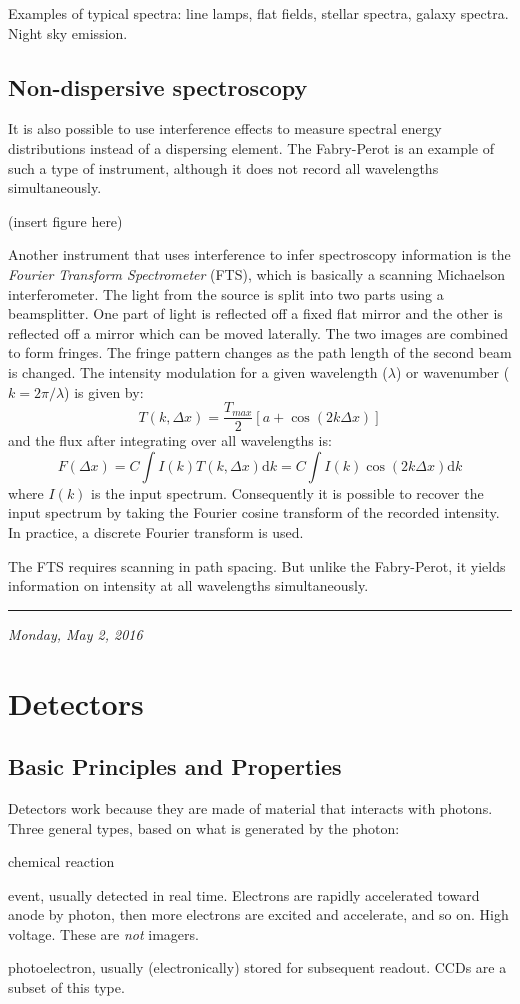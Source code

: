 \documentclass[12pt]{article}
\newcommand{\mydate}[1]{
    \begin{flushright}
        \rule{\textwidth}{0.4pt} %
        \footnotesize\hfill\textit{#1}
    \end{flushright}}
\begin{document}
Examples of typical spectra: line lamps, flat fields, stellar spectra,
galaxy spectra. Night sky emission.

\subsection{Non-dispersive spectroscopy}
It is also possible to use interference effects to measure spectral
energy distributions instead of a dispersing element. The Fabry-Perot
is an example of such a type of instrument, although it does not
record all wavelengths simultaneously.

(insert figure here)

Another instrument that uses interference to infer spectroscopy
information is the \textit{Fourier Transform Spectrometer} (FTS), which is
basically a scanning Michaelson interferometer. The light from the
source is split into two parts using a beamsplitter. One part of light
is reflected off a fixed flat mirror and the other is reflected off a
mirror which can be moved laterally. The two images are combined to
form fringes. The fringe pattern changes as the path length of the
second beam is changed. The intensity modulation for a given
wavelength ($\lambda$) or wavenumber ($k = 2\pi/\lambda$) is
given by:
\[
    T \left( k,\Delta{x} \right)
    = \frac{T_{max}}{2} \left[ a + \cos \left( 2k\Delta{x} \right) \right]
    \]
and the flux after integrating over all wavelengths is:
\[
    F \left( \Delta{x}\right)
    = C \int{ I(k) T (k,\Delta{x}) \mathrm{d}k}
    = C \int{ I(k) \cos (2k\Delta{x}) \mathrm{d}k}
    \]
where $I(k)$ is the input spectrum. Consequently it is possible to
recover the input spectrum by taking the Fourier cosine transform of
the recorded intensity. In practice, a discrete Fourier transform is
used.

The FTS requires scanning in path spacing. But unlike the Fabry-Perot,
it yields information on intensity at all wavelengths simultaneously.

\newpage
\mydate{Monday, May 2, 2016}
\section{Detectors}
\subsection{Basic Principles and Properties}
Detectors work because they are made of material that interacts
with photons. Three general types, based on what is generated
by the photon:
\begin{description}[labelwidth=10em, leftmargin=12em]
    \item [Photographic detector] chemical reaction
    \item [Photomultiplier/photon counter] event, usually detected
        in real time. Electrons are rapidly accelerated toward anode
        by photon, then more electrons are excited and accelerate, and
        so on. High voltage. These are \emph{not} imagers.
    \item [Photon collecter] photoelectron, usually (electronically)
        stored for subsequent readout. CCDs are a subset of this type.
\end{description}
\end{document}
